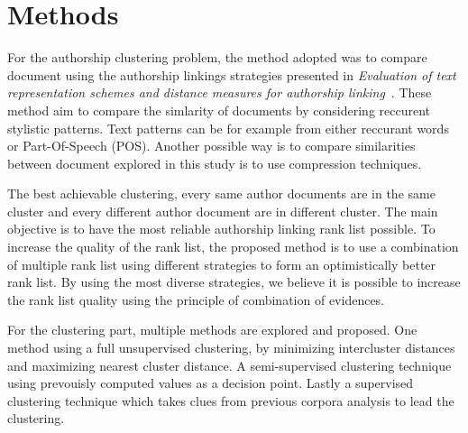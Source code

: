 \section{Methods \label{sec:methods}}

For the authorship clustering problem, the method adopted was to compare document using the authorship linkings strategies presented in \textit{Evaluation of text representation schemes and distance measures for authorship linking}~\cite{kocher_verification}.
These method aim to compare the simlarity of documents by considering reccurent stylistic patterns.
Text patterns can be for example from either reccurant words or Part-Of-Speech (POS).
Another possible way is to compare similarities between document explored in this study is to use compression techniques.

The best achievable clustering, every same author documents are in the same cluster and every different author document are in different cluster.
The main objective is to have the most reliable authorship linking rank list possible.
To increase the quality of the rank list, the proposed method is to use a combination of multiple rank list using different strategies to form an optimistically better rank list.
By using the most diverse strategies, we believe it is possible to increase the rank list quality using the principle of combination of evidences.

For the clustering part, multiple methods are explored and proposed.
One method using a full unsupervised clustering, by minimizing intercluster distances and maximizing nearest cluster distance.
A semi-supervised clustering technique using prevouisly computed values as a decision point.
Lastly a supervised clustering technique which takes clues from previous corpora analysis to lead the clustering.








